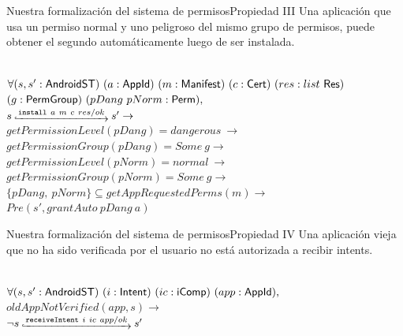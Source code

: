\documentclass[pdf, handout]{beamer} %
\begin{document}
\begin{frame}{Nuestra formalización del sistema de permisos}{Propiedad III}
    Una aplicación que usa un permiso normal y uno peligroso del mismo grupo de permisos, puede obtener el segundo automáticamente luego de ser instalada.
    \pause
    \begin{prop} \mbox{} \\
        \fontsize{9pt}{15pt}\selectfont
        $\forall (s,s': \mathsf{AndroidST})~(a: \mathsf{AppId})~(m: \mathsf{Manifest})~(c: \mathsf{Cert})~(res: list~\mathsf{Res})$\\
        $(g:\mathsf{PermGroup})~(pDang~pNorm: \mathsf{Perm}),$\\
        \hspace{15px}$\Mathexecrel{s}{\texttt{install}~a~m~c~res/ok}{s'} \rightarrow$ \\
        \hspace{15px}$getPermissionLevel(pDang) = dangerous~ \rightarrow$ \\
        \hspace{15px}$getPermissionGroup(pDang) = Some\ g \rightarrow$ \\
        \hspace{15px}$getPermissionLevel(pNorm) = normal~ \rightarrow$ \\
        \hspace{15px}$getPermissionGroup(pNorm) = Some\ g \rightarrow$ \\
        \hspace{15px}$\{pDang,~pNorm\} \subseteq getAppRequestedPerms(m) \rightarrow$\\
        \hspace{15px}$Pre(s', grantAuto~pDang~a)$
    \end{prop}
\end{frame}

\begin{frame}{Nuestra formalización del sistema de permisos}{Propiedad IV}
    Una aplicación vieja que no ha sido verificada por el usuario no está autorizada a recibir intents.
    \pause \vspace{20px}
    \begin{prop} \mbox{} \\
        $\forall (s,s': \mathsf{AndroidST})~(i:\mathsf{Intent})~(ic:\mathsf{iComp})~(app:\mathsf{AppId}),$ \\
        $oldAppNotVerified(app, s) \rightarrow$ \\
        $\neg \Mathexecrel{s}{\texttt{receiveIntent}~i~ic~app/ok}{s'}$
    \end{prop}
\end{frame}
\end{document}

